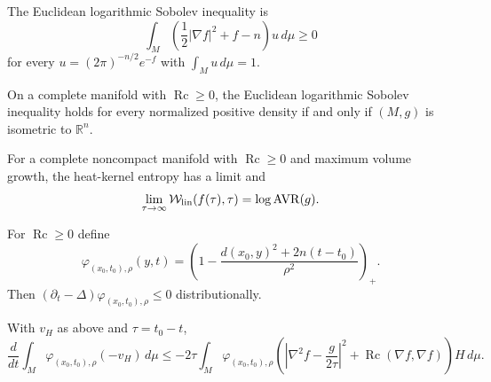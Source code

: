 \begin{definition}
\label{def:chow-ii-ch16-euclidean-log-sobolev}
The Euclidean logarithmic Sobolev inequality is
\[
\int_M\left(\frac12|\nabla f|^2+f-n\right)u\,d\mu\ge0
\]
for every $u=(2\pi)^{-n/2}e^{-f}$ with $\int_Mu\,d\mu=1$.
\end{definition}

\begin{theorem}
\label{thm:chow-ii-ch16-bakry-concordet-ledoux}
On a complete manifold with $\operatorname{Rc}\ge0$, the Euclidean logarithmic
Sobolev inequality holds for every normalized positive density if and only if
$(M,g)$ is isometric to $\mathbb R^n$.
\end{theorem}

\begin{theorem}
\label{thm:chow-ii-ch16-entropy-avr}
For a complete noncompact manifold with $\operatorname{Rc}\ge0$ and maximum
volume growth, the heat-kernel entropy has a limit and
\[
\lim_{\tau\to\infty}\mathcal W_{\rm lin}(f(\tau),\tau)=\log\operatorname{AVR}(g).
\]
\end{theorem}

\begin{definition}
\label{def:chow-ii-ch16-heat-cutoff}
For $\operatorname{Rc}\ge0$ define
\[
\varphi_{(x_0,t_0),\rho}(y,t)=\left(1-
 \frac{d(x_0,y)^2+2n(t-t_0)}{\rho^2}\right)_+.
\]
Then $(\partial_t-\Delta)\varphi_{(x_0,t_0),\rho}\le0$ distributionally.
\end{definition}

\begin{theorem}
\label{thm:chow-ii-ch16-local-linear-entropy}
With $v_H$ as above and $\tau=t_0-t$,
\[
\frac{d}{dt}\int_M\varphi_{(x_0,t_0),\rho}(-v_H)\,d\mu
\le-2\tau\int_M\varphi_{(x_0,t_0),\rho}
 \left(\left|\nabla^2f-\frac{g}{2\tau}\right|^2
 +\operatorname{Rc}(\nabla f,\nabla f)\right)H\,d\mu.
\]
\end{theorem}

